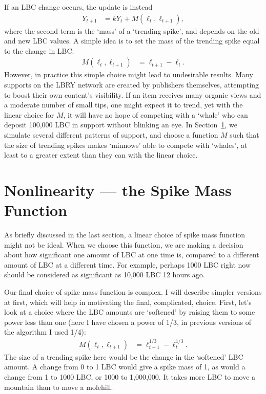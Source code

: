 \documentclass[a4paper, 12pt]{article}
\begin{document}
If an LBC change occurs, the update is instead
\begin{align}
Y_{t+1} &= kY_t + M(\ell_t, \ell_{t+1}), \label{eqn:decay_with_spike}
\end{align}
where the second term is the `mass' of a `trending spike', and depends on
the old and new LBC values. A simple idea is to set the mass of the trending
spike equal to the change in LBC:
\begin{align}
M(\ell_t, \ell_{t+1}) &= \ell_{t+1} - \ell_t.
\end{align}
However, in practice this simple choice might lead to undesirable results.
Many supports on the LBRY network are created by publishers themselves,
attempting to boost their own content's visibility. If an item receives
many organic views and a moderate number of small tips, one might expect it
to trend, yet with the linear choice for $M$, it will have no hope of
competing with a `whale' who can deposit 100,000 LBC in support without
blinking an eye. In Section~\ref{sec:spike_mass}, we simulate several
different patterns of support, and choose a function $M$ such that
the size of trending spikes makes `minnows' able to compete with `whales',
at least to a greater extent than they can with the linear choice.

\section{Nonlinearity --- the Spike Mass Function}\label{sec:spike_mass}
As briefly discussed in the last section, a linear choice of spike mass
function might not be ideal. When we choose this function, we are making
a decision about how significant one amount of LBC at one time is, compared
to a different amount of LBC at a different time. For example, perhaps
1000 LBC right now should be considered as
significant as 10,000 LBC 12 hours ago.

Our final choice of spike mass function is complex. I will describe simpler
versions at first, which will help in motivating the final, complicated, choice.
First, let's look at a choice where the LBC amounts are `softened' by raising
them to some power less than one (here I have chosen a power of 1/3, in
previous versions of the algorithm I used 1/4):
\begin{align}
M(\ell_t, \ell_{t+1}) &= \ell_{t+1}^{1/3} - \ell_t^{1/3}.
\end{align}
The size of a trending spike here would be the change in the `softened'
LBC amount. A change from 0 to 1 LBC would give a spike mass of 1,
as would a change from 1 to 1000 LBC, or 1000 to 1,000,000. It takes more
LBC to move a mountain than to move a molehill.
\end{document}
